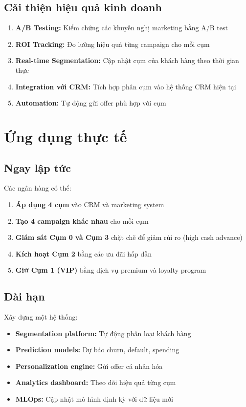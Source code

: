 \subsection{Cải thiện hiệu quả kinh doanh}

\begin{enumerate}
    \item \textbf{A/B Testing:} Kiểm chứng các khuyến nghị marketing bằng A/B test
    \item \textbf{ROI Tracking:} Đo lường hiệu quả từng campaign cho mỗi cụm
    \item \textbf{Real-time Segmentation:} Cập nhật cụm của khách hàng theo thời gian thực
    \item \textbf{Integration với CRM:} Tích hợp phân cụm vào hệ thống CRM hiện tại
    \item \textbf{Automation:} Tự động gửi offer phù hợp với cụm
\end{enumerate}

\section{Ứng dụng thực tế}

\subsection{Ngay lập tức}

Các ngân hàng có thể:
\begin{enumerate}
    \item \textbf{Áp dụng 4 cụm} vào CRM và marketing system
    \item \textbf{Tạo 4 campaign khác nhau} cho mỗi cụm
    \item \textbf{Giám sát Cụm 0 và Cụm 3} chặt chẽ để giảm rủi ro (high cash advance)
    \item \textbf{Kích hoạt Cụm 2} bằng các ưu đãi hấp dẫn
    \item \textbf{Giữ Cụm 1 (VIP)} bằng dịch vụ premium và loyalty program
\end{enumerate}

\subsection{Dài hạn}

Xây dựng một hệ thống:
\begin{itemize}
    \item \textbf{Segmentation platform:} Tự động phân loại khách hàng
    \item \textbf{Prediction models:} Dự báo churn, default, spending
    \item \textbf{Personalization engine:} Gửi offer cá nhân hóa
    \item \textbf{Analytics dashboard:} Theo dõi hiệu quả từng cụm
    \item \textbf{MLOps:} Cập nhật mô hình định kỳ với dữ liệu mới
\end{itemize}

